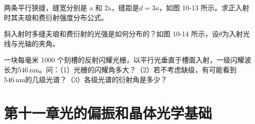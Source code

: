 \documentclass[standard, analysis, notocnum]{ExBook}
\newcommand{\answerarea}[1][8cm]{%
  \par\vspace{2mm}%
  \noindent{\color{themeColor!35}\rule{\linewidth}{0.4pt}}\par
  \noindent\begin{minipage}[t][#1][t]{\linewidth}\vspace{0pt}\end{minipage}\par
  \noindent{\color{themeColor!35}\rule{\linewidth}{0.4pt}}\par
}
\begin{document}
\begin{qitems}[startnum=8]
\qitem 两条平行狭缝，缝宽分别是 a 和 2a，缝距是$d=3a$，如图 10-13 所示。求正入射时其夫琅和费衍射强度分布公式。
\label{q:247:start}
\answerarea[8cm]
\label{q:247:end}
\end{qitems}

\begin{qitems}[startnum=9]
\qitem 斜入射时多缝夫琅和费衍射的光强是如何分布的？如图 10-14 所示，设$\theta$为入射光线与光轴的夹角。
\label{q:248:start}
\answerarea[8cm]
\label{q:248:end}
\end{qitems}

\begin{qitems}[startnum=10]
\qitem 一块每毫米 1000 个刻槽的反射闪耀光栅，以平行光垂直于槽面入射，一级闪耀波长为$546\,\mathrm{nm}$。问：（1）光栅的闪耀角多大？（2）若不考虑缺级，有可能看到$546\,\mathrm{nm}$的几级光谱？（3）各级光谱的衍射角是多少？
\label{q:249:start}
\answerarea[8cm]
\label{q:249:end}
\end{qitems}

\section{第十一章\quad 光的偏振和晶体光学基础}
\end{document}
